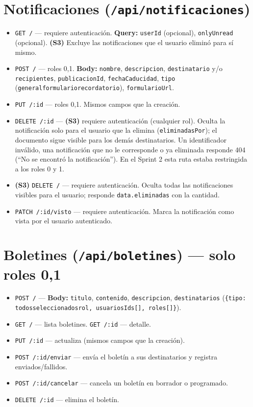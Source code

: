 \section{Notificaciones (\texttt{/api/notificaciones})}
\begin{itemize}
    \item \texttt{GET /} — requiere autenticación. \textbf{Query:} \texttt{userId} (opcional), \texttt{onlyUnread} (opcional). \textbf{(S3)} Excluye las notificaciones que el usuario eliminó para sí mismo.
    \item \texttt{POST /} — roles 0,1. \textbf{Body:} \texttt{nombre}, \texttt{descripcion}, \texttt{destinatario} y/o \texttt{recipientes}, \texttt{publicacionId}, \texttt{fechaCaducidad}, \texttt{tipo} (\texttt{general}\textbar\texttt{formulario}\textbar\texttt{recordatorio}), \texttt{formularioUrl}.
    \item \texttt{PUT /:id} — roles 0,1. Mismos campos que la creación.
    \item \texttt{DELETE /:id} — \textbf{(S3)} requiere autenticación (cualquier rol). Oculta la notificación solo para el usuario que la elimina (\texttt{eliminadasPor}); el documento sigue visible para los demás destinatarios. Un identificador inválido, una notificación que no le corresponde o ya eliminada responde 404 (``No se encontró la notificación''). En el Sprint 2 esta ruta estaba restringida a los roles 0 y 1.
    \item \textbf{(S3)} \texttt{DELETE /} — requiere autenticación. Oculta todas las notificaciones visibles para el usuario; responde \texttt{data.eliminadas} con la cantidad.
    \item \texttt{PATCH /:id/visto} — requiere autenticación. Marca la notificación como vista por el usuario autenticado.
\end{itemize}

\section{Boletines (\texttt{/api/boletines}) --- solo roles 0,1}
\begin{itemize}
    \item \texttt{POST /} — \textbf{Body:} \texttt{titulo}, \texttt{contenido}, \texttt{descripcion}, \texttt{destinatarios} (\texttt{\{tipo: todos\textbar seleccionados\textbar rol, usuariosIds[], roles[]\}}).
    \item \texttt{GET /} — lista boletines. \texttt{GET /:id} — detalle.
    \item \texttt{PUT /:id} — actualiza (mismos campos que la creación).
    \item \texttt{POST /:id/enviar} — envía el boletín a sus destinatarios y registra enviados/fallidos.
    \item \texttt{POST /:id/cancelar} — cancela un boletín en borrador o programado.
    \item \texttt{DELETE /:id} — elimina el boletín.
\end{itemize}

